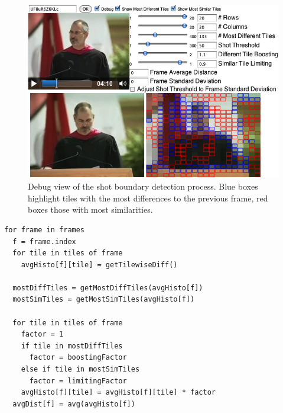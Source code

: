 \begin{figure}
\begin{center}
   \includegraphics[width=1.0\linewidth]{./algorithm.png}
\end{center}
   \caption{Debug view of the shot boundary detection process. Blue boxes highlight tiles with the most differences to the previous frame, red boxes those with most similarities.}
\label{fig:algorithm}
\end{figure}

\begin{lstlisting}[caption=Pseudocode of shot boundary detection algorithm., label=code:algorithm, float]
for frame in frames
  f = frame.index  
  for tile in tiles of frame      
    avgHisto[f][tile] = getTilewiseDiff()
 
  mostDiffTiles = getMostDiffTiles(avgHisto[f])
  mostSimTiles = getMostSimTiles(avgHisto[f])
 
  for tile in tiles of frame    
    factor = 1  
    if tile in mostDiffTiles
      factor = boostingFactor
    else if tile in mostSimTiles
      factor = limitingFactor
    avgHisto[f][tile] = avgHisto[f][tile] * factor
  avgDist[f] = avg(avgHisto[f])
\end{lstlisting}


